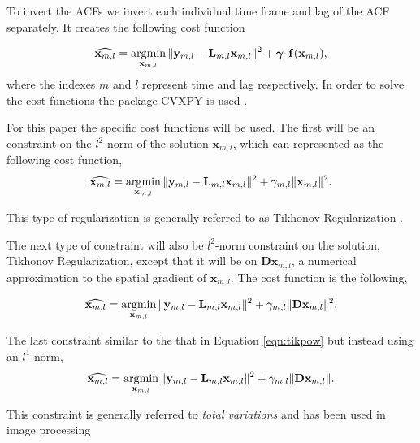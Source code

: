 To invert the ACFs we invert each individual time frame and lag of the ACF separately. It creates the following cost function

\begin{equation}
\label{eqn:lstsqrsvecdblag}
\widehat{\mathbf{x}_{m,l}} = \operatorname*{\arg\!\min}\limits_{\mathbf{x}_{m,l}} \|\mathbf{y}_{m,l} -\mathbf{L}_{m,l}\mathbf{x}_{m,l} \|^2 + \boldsymbol{\gamma}\cdotp\mathbf{f}(\mathbf{x}_{m,l}),
\end{equation}
\noindent where the indexes $m$ and $l$ represent time and lag respectively. In order to solve the cost functions the package CVXPY is used \citep{cvxpy}.

For this paper the specific cost functions will be used. The first will be an constraint on the $l^2$-norm of the solution $\mathbf{x}_{m,l}$, which can represented as the following cost function,
\begin{equation}
\label{eqn:tikpow}
\widehat{\mathbf{x}_{m,l}} = \operatorname*{\arg\!\min}\limits_{\mathbf{x}_{m,l}} \|\mathbf{y}_{m,l} -\mathbf{L}_{m,l}\mathbf{x}_{m,l} \|^2 +\gamma_{m,l} \|\mathbf{x}_{m,l}\|^2.
\end{equation}

\noindent This type of regularization is generally referred to as Tikhonov Regularization \citep{Karl:2005jy}.

The next type of constraint will also be $l^2$-norm constraint on the solution, Tikhonov Regularization, except that it will be on $\mathbf{D}\mathbf{x}_{m,l}$, a numerical approximation to the spatial gradient of $\mathbf{x}_{m,l}$. The cost function is the following,

\begin{equation}
\label{eqn:tikD}
\widehat{\mathbf{x}_{m,l}} = \operatorname*{\arg\!\min}\limits_{\mathbf{x}_{m,l}} \|\mathbf{y}_{m,l} -\mathbf{L}_{m,l}\mathbf{x}_{m,l} \|^2 + \gamma_{m,l} \|\mathbf{D}\mathbf{x}_{m,l}\|^2.
\end{equation}

\noindent The last constraint similar to the that in Equation \ref{eqn:tikpow} but instead using an $l^1$-norm,
\begin{equation}
\label{eqn:tv}
\widehat{\mathbf{x}_{m,l}} = \operatorname*{\arg\!\min}\limits_{\mathbf{x}_{m,l}} \|\mathbf{y}_{m,l} -\mathbf{L}_{m,l}\mathbf{x}_{m,l} \|^2 + \gamma_{m,l} \|\mathbf{D}\mathbf{x}_{m,l}\|.
\end{equation} 

\noindent This constraint is generally referred to \textit{total variations} and has been used in image processing \citep{Rudin:1992kn}

